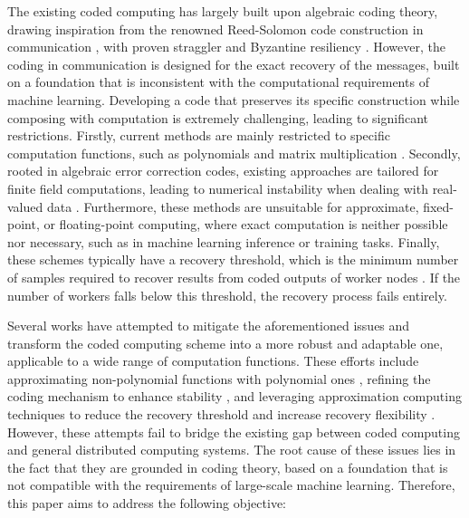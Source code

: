 \documentclass{article}
\begin{document}
The existing coded computing has largely built upon algebraic coding theory, drawing inspiration from the renowned Reed-Solomon code construction in communication \citep{reedSolomon}, with proven straggler and Byzantine resiliency \cite{SudanBook}. However, the coding in communication is designed for the exact recovery of the messages, 
 built on a foundation that is inconsistent with the computational requirements of machine learning.
Developing a code that preserves its specific construction while composing with computation is extremely challenging, leading to significant restrictions. Firstly, current methods are mainly restricted to specific computation functions, such as polynomials and matrix multiplication \cite{yu2019lagrange,speed,high,yu2017polynomial,yu2020straggler}. Secondly, rooted in algebraic error correction codes, existing approaches are tailored for finite field computations, leading to numerical instability when dealing with real-valued data \cite{gautschi1987lower,golub2013matrix}.  Furthermore, these methods are unsuitable for approximate, fixed-point, or floating-point computing, where exact computation is neither possible nor necessary, such as in machine learning inference or training tasks. Finally, these schemes typically have a recovery threshold, which is the minimum number of samples required to recover results from coded outputs of worker nodes \cite{yu2019lagrange,yu2017polynomial}. If the number of workers falls below this threshold, the recovery process fails entirely.

Several works have attempted to mitigate the aforementioned issues and transform the coded computing scheme into a more robust and adaptable one, applicable to a wide range of computation functions. These efforts include approximating non-polynomial functions with polynomial ones \cite{so2020scalable,codedpri}, refining the coding mechanism to enhance stability \cite{AnooshehRobust,RamamoorthyCir,RamamoorthyConv,soleymani2020analog,fahim2019numerically}, and leveraging approximation computing techniques to reduce the recovery threshold and increase recovery flexibility \cite{jahani2018codedsketch,overSketch,overSketchN,jahani2022berrut}. However, these attempts fail to bridge the existing gap between coded computing and general distributed computing systems. The root cause of these issues lies in the fact that they are grounded in coding theory, based on a foundation that is not compatible with the requirements of large-scale machine learning. Therefore, this paper aims to address the following objective:
\end{document}
